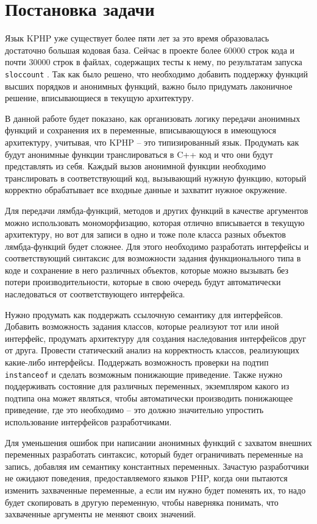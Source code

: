 
\startrelatedwork
\chapter{Постановка задачи}
Язык KPHP уже существует более пяти лет за это время образовалась достаточно большая кодовая база.
Сейчас в проекте более 60000 строк кода и почти 30000 строк в файлах, содержащих тесты к нему, по результатам запуска \verb|sloccount| \cite{sloccount}. Так как было решено, что необходимо добавить поддержку функций высших порядков и анонимных функций, важно было придумать лаконичное решение, вписывающиеся в текущую архитектуру.

В данной работе будет показано, как организовать логику передачи анонимных функций и сохранения их в переменные, вписывающуюся в имеющуюся архитектуру, учитывая, что KPHP -- это типизированный язык. Продумать как будут анонимные функции транслироваться в C++ код и что они будут представлять из себя. Каждый вызов анонимной функции необходимо транслировать в соответствующий код, вызывающий нужную функцию, который корректно обрабатывает все входные данные и захватит нужное окружение.

Для передачи лямбда-функций, методов и других функций в качестве аргументов можно использовать мономорфизацию, которая отлично вписывается в текущую архитектуру, но вот для записи в одно и тоже поле класса разных объектов лямбда-функций будет сложнее. Для этого необходимо разработать интерфейсы и соответствующий синтаксис для возможности задания функционального типа в коде и сохранение в него различных объектов, которые можно вызывать без потери производительности, которые в свою очередь будут автоматически наследоваться от соответствующего интерфейса. 

Нужно продумать как поддержать ссылочную семантику для интерфейсов.
Добавить возможность задания классов, которые реализуют тот или иной интерфейс, продумать архитектуру для создания наследования интерфейсов друг от друга.
Провести статический анализ на корректность классов, реализующих какие-либо интерфейсы.
Поддержать возможность проверки на подтип \verb|instanceof| и сделать возможным понижающие приведение.
Также нужно поддерживать состояние для различных переменных, экземпляром какого из подтипа она может являться, чтобы автоматически производить понижающее приведение, где это необходимо -- это должно значительно упростить использование интерфейсов разработчиками.

Для уменьшения ошибок при написании анонимных функций с захватом внешних переменных разработать синтаксис, который будет ограничивать переменные на запись, добавляя им семантику константных переменных.
Зачастую разработчики не ожидают поведения, предоставляемого языков PHP, когда они пытаются изменить захваченные переменные, а если им нужно будет поменять их, то надо будет скопировать в другую переменную, чтобы наверняка понимать, что захваченные аргументы не меняют своих значений.


